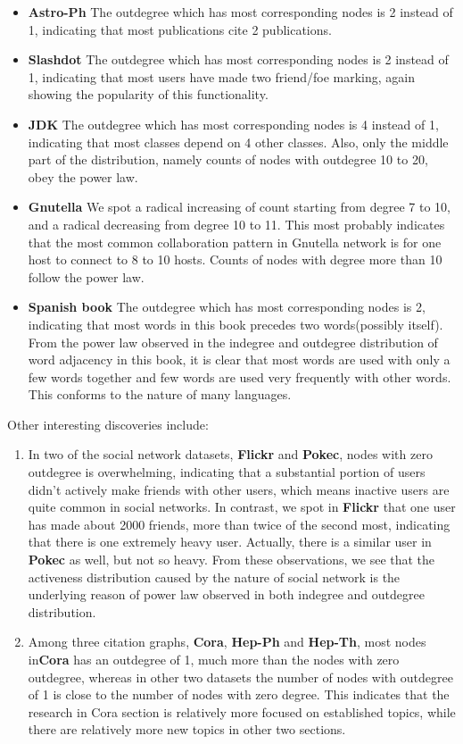 \begin{itemize}
\item \textbf{Astro-Ph} The outdegree which has most corresponding nodes is 2 instead of 1, indicating that most publications cite 2 publications.
\item \textbf{Slashdot} The outdegree which has most corresponding nodes is 2 instead of 1, indicating that most users have made two friend/foe marking, again showing the popularity of this functionality.
\item \textbf{JDK} The outdegree which has most corresponding nodes is 4 instead of 1, indicating that most classes depend on 4 other classes. Also, only the middle part of the distribution, namely counts of nodes with outdegree 10 to 20, obey the power law.
\item \textbf{Gnutella} We spot a radical increasing of count starting from degree 7 to 10, and a radical decreasing from degree 10 to 11. This most probably indicates that the most common collaboration pattern in Gnutella network is for one host to connect to 8 to 10 hosts. Counts of nodes with degree more than 10 follow the power law.
\item \textbf{Spanish book} The outdegree which has most corresponding nodes is 2, indicating that most words in this book precedes two words(possibly itself). From the power law observed in the indegree and outdegree distribution of word adjacency in this book, it is clear that most words are used with only a few words together and few words are used very frequently with other words. This conforms to the nature of many languages.
\end{itemize}

\par Other interesting discoveries include:
\begin{enumerate}
\item In two of the social network datasets, \textbf{Flickr} and \textbf{Pokec}, nodes with zero outdegree is overwhelming, indicating that a substantial portion of users didn't actively make friends with other users, which means inactive users are quite common in social networks. In contrast, we spot in \textbf{Flickr} that one user has made about 2000 friends, more than twice of the second most, indicating that there is one extremely heavy user. Actually, there is a similar user in \textbf{Pokec} as well, but not so heavy. From these observations, we see that the activeness distribution caused by the nature of social network is the underlying reason of power law observed in both indegree and outdegree distribution.
\item Among three citation graphs, \textbf{Cora}, \textbf{Hep-Ph} and \textbf{Hep-Th}, most nodes in\textbf{Cora} has an outdegree of 1, much more than the nodes with zero outdegree, whereas in other two datasets the number of nodes with outdegree of 1 is close to the number of nodes with zero degree. This indicates that the research in Cora section is relatively more focused on established topics, while there are relatively more new topics in other two sections.
\end{enumerate}

